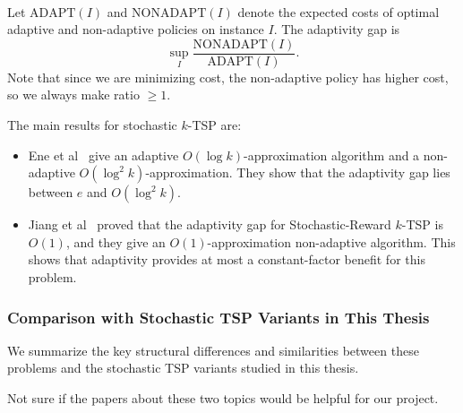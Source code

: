 \begin{definition}\hfill\\
    Let $\mathrm{ADAPT}(I)$ and $\mathrm{NONADAPT}(I)$ denote the expected costs of optimal adaptive and non-adaptive policies on instance $I$. The adaptivity gap is
    \[
        \sup_{I} \frac{\mathrm{NONADAPT}(I)}{\mathrm{ADAPT}(I)}.
    \]
    Note that since we are minimizing cost, the non-adaptive policy has higher cost, so we always make ratio $\ge 1$.
\end{definition}

The main results for stochastic $k$-TSP are:
\begin{itemize}
    \item Ene et al~\cite{EneNagarajanSaket2017} give an adaptive $O(\log k)$-approximation algorithm and a non-adaptive $O(\log^2 k)$-approximation. They show that the adaptivity gap lies between $e$ and $O(\log^2 k)$.
    \item Jiang et al~\cite{JiangLiLiuSingla2020} proved that the adaptivity gap for Stochastic-Reward $k$-TSP is $O(1)$, and they give an $O(1)$-approximation non-adaptive algorithm. This shows that adaptivity provides at most a constant-factor benefit for this problem.
\end{itemize}

\subsubsection{Comparison with Stochastic TSP Variants in This Thesis}

We summarize the key structural differences and similarities between these problems and the stochastic TSP variants studied in this thesis.

\begin{center}
\end{center}

Not sure if the papers about these two topics would be helpful for our project.
